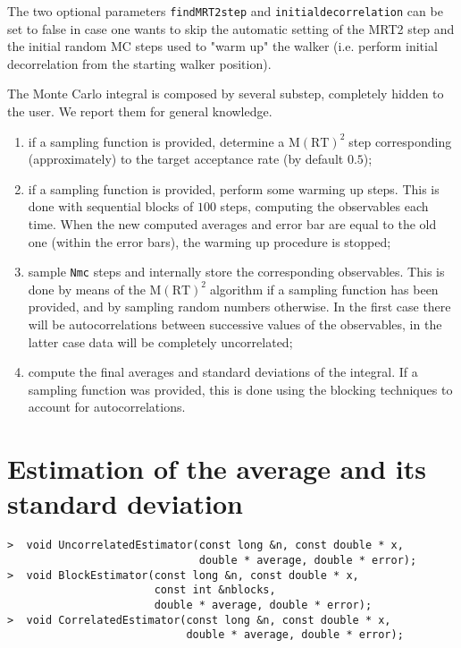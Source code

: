 \documentclass[11pt,a4paper,twoside]{article}
\newcommand{\MRTWO}{$ \text{M}(\text{RT})^2 \;$}
\begin{document}
The two optional parameters \verb+findMRT2step+ and \verb+initialdecorrelation+ can be set to false in case one wants to skip the automatic setting of the MRT2 step and the initial random MC steps used to "warm up" the walker (i.e. perform initial decorrelation from the starting walker position).

The Monte Carlo integral is composed by several substep, completely hidden to the user.
We report them for general knowledge.
\begin{enumerate}
\item if a sampling function is provided, determine a \MRTWO step corresponding (approximately) to the target acceptance rate (by default $0.5$);
\item if a sampling function is provided, perform some warming up steps. This is done with sequential blocks of $100$ steps, computing the observables each time. When the new computed averages and error bar are equal to the old one (within the error bars), the warming up procedure is stopped;
\item sample \verb+Nmc+ steps and internally store the corresponding observables. This is done by means of the \MRTWO algorithm if a sampling function has been provided, and by sampling random numbers otherwise. In the first case there will be autocorrelations between successive values of the observables, in the latter case data will be completely uncorrelated;
\item compute the final averages and standard deviations of the integral. If a sampling function was provided, this is done using the blocking techniques to account for autocorrelations.
\end{enumerate}





\section{Estimation of the average and its standard deviation} %
\label{sec:mean_estimation_and_standard_deviation}

\begin{verbatim}
>  void UncorrelatedEstimator(const long &n, const double * x,
                              double * average, double * error);
>  void BlockEstimator(const long &n, const double * x,
                       const int &nblocks,
                       double * average, double * error);
>  void CorrelatedEstimator(const long &n, const double * x,
                            double * average, double * error);
\end{verbatim}
\end{document}
